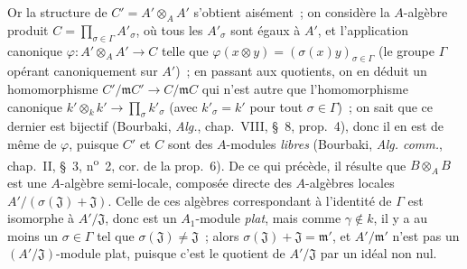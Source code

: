\begin{env}[11.7.1]
Or la structure de $C'=A'\otimes_A A'$ s'obtient aisément~; on considère la
$A$-algèbre produit $C=\prod_{\sigma\in\Gamma}A'_{\sigma}$, où tous les
$A'_{\sigma}$ sont égaux à $A'$, et l'application canonique
$\varphi:A'\otimes_A A'\to C$ telle que
$\varphi(x\otimes y)=(\sigma(x)y)_{\sigma\in\Gamma}$ (le groupe $\Gamma$
opérant canoniquement sur $A'$)~; en passant aux quotients, on en déduit un
homomorphisme $C'/\mathfrak m C'\to C/\mathfrak m C$ qui n'est autre que
l'homomorphisme canonique
$k'\otimes_k k'\to\prod_{\sigma}k'_{\sigma}$ (avec $k'_{\sigma}=k'$ pour tout
$\sigma\in\Gamma$)~; on sait que ce dernier est bijectif (Bourbaki,
\emph{Alg.}, chap.~VIII, \S~8, prop.~4), donc il en est de même de $\varphi$,
puisque $C'$ et $C$ sont des $A$-modules \emph{libres} (Bourbaki,
\emph{Alg. comm.}, chap.~II, \S~3, n\textsuperscript{o}~2, cor. de la prop.~6). De ce qui
précède, il résulte que $B\otimes_A B$ est une $A$-algèbre semi-locale, composée
directe des $A$-algèbres locales $A'/(\sigma(\mathfrak J)+\mathfrak J)$. Celle
de ces algèbres correspondant à l'identité de $\Gamma$ est isomorphe à
$A'/\mathfrak J$, donc est un $A_1$-module \emph{plat}, mais comme $\gamma\notin k$, il
y a au moins un $\sigma\in\Gamma$ tel que
$\sigma(\mathfrak J)\ne\mathfrak J$~; alors
$\sigma(\mathfrak J)+\mathfrak J=\mathfrak m'$, et $A'/\mathfrak m'$ n'est pas
un $(A'/\mathfrak J)$-module plat, puisque c'est le quotient de
$A'/\mathfrak J$ par un idéal non nul.
\end{env}

